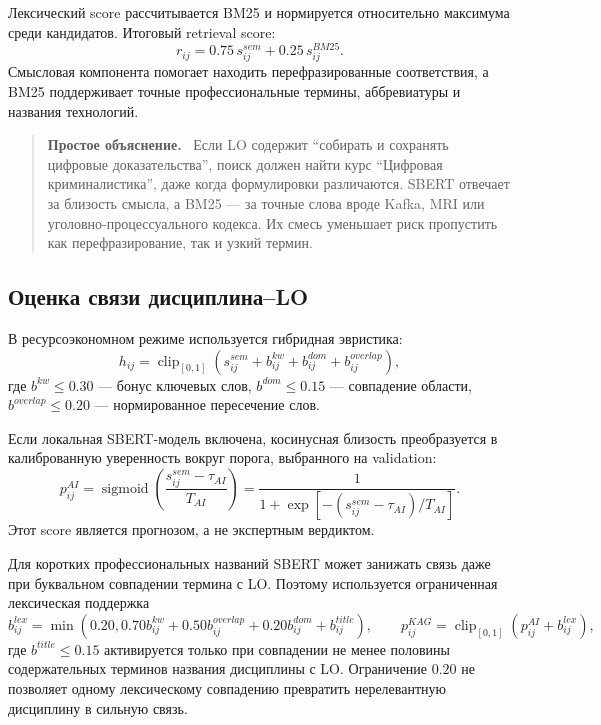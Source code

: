 \documentclass[twoside,11pt]{article}
\newcommand{\clip}{\operatorname{clip}}
\newcommand{\sigmoid}{\operatorname{sigmoid}}
\newenvironment{plainbox}{%
  \begin{quote}\small\noindent\textbf{Простое объяснение.}\ }{%
  \end{quote}}
\begin{document}
Лексический score рассчитывается BM25 \cite{Robertson2009} и нормируется относительно максимума среди кандидатов. Итоговый retrieval score:
\begin{equation}
  r_{ij}=0.75\,s_{ij}^{sem}+0.25\,s_{ij}^{BM25}.
  \label{eq:hybrid}
\end{equation}
Смысловая компонента помогает находить перефразированные соответствия, а BM25 поддерживает точные профессиональные термины, аббревиатуры и названия технологий.

\begin{plainbox}
Если LO содержит ``собирать и сохранять цифровые доказательства'', поиск должен
найти курс ``Цифровая криминалистика'', даже когда формулировки различаются.
SBERT отвечает за близость смысла, а BM25 --- за точные слова вроде Kafka,
MRI или уголовно-процессуального кодекса. Их смесь уменьшает риск пропустить
как перефразирование, так и узкий термин.
\end{plainbox}

\subsection{Оценка связи дисциплина--LO}

В ресурсоэкономном режиме используется гибридная эвристика:
\begin{equation}
  h_{ij}=\clip_{[0,1]}
  \left(
    s_{ij}^{sem}
    +b_{ij}^{kw}
    +b_{ij}^{dom}
    +b_{ij}^{overlap}
  \right),
  \label{eq:heuristic}
\end{equation}
где $b^{kw}\le0.30$ --- бонус ключевых слов, $b^{dom}\le0.15$ --- совпадение области, $b^{overlap}\le0.20$ --- нормированное пересечение слов.

Если локальная SBERT-модель включена, косинусная близость преобразуется в калиброванную уверенность вокруг порога, выбранного на validation:
\begin{equation}
  p_{ij}^{AI}=
  \sigmoid\left(
    \frac{s_{ij}^{sem}-\tau_{AI}}{T_{AI}}
  \right)
  =
  \frac{1}
       {1+\exp\left[-(s_{ij}^{sem}-\tau_{AI})/T_{AI}\right]}.
  \label{eq:calibration}
\end{equation}
Этот score является прогнозом, а не экспертным вердиктом.

Для коротких профессиональных названий SBERT может занижать связь даже при буквальном совпадении термина с LO. Поэтому используется ограниченная лексическая поддержка
\begin{equation}
  b_{ij}^{lex}=\min\!\left(0.20,
  0.70b_{ij}^{kw}+0.50b_{ij}^{overlap}+0.20b_{ij}^{dom}+b_{ij}^{title}\right),
  \qquad
  p_{ij}^{KAG}=\clip_{[0,1]}\left(p_{ij}^{AI}+b_{ij}^{lex}\right),
  \label{eq:ai-lexical-support}
\end{equation}
где $b^{title}\le0.15$ активируется только при совпадении не менее половины содержательных терминов названия дисциплины с LO. Ограничение $0.20$ не позволяет одному лексическому совпадению превратить нерелевантную дисциплину в сильную связь.
\end{document}
